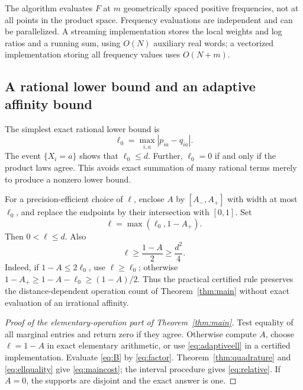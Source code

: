 \documentclass[11pt]{article}
\theoremstyle{definition}
\theoremstyle{remark}
\begin{document}
The algorithm evaluates $F$ at $m$ geometrically spaced positive frequencies, not at all points in the product space. Frequency evaluations are independent and can be parallelized. A streaming implementation stores the local weights and log ratios and a running sum, using $O(N)$ auxiliary real words; a vectorized implementation storing all frequency values uses $O(N+m)$.

\subsection{A rational lower bound and an adaptive affinity bound}

The simplest exact rational lower bound is
\begin{equation}
 \ell_0=\max_{i,a}|p_{ia}-q_{ia}|.
 \label{eq:l0}
\end{equation}
The event $\{X_i=a\}$ shows that $\ell_0\le d$. Further, $\ell_0=0$ if and only if the product laws agree. This avoids exact summation of many rational terms merely to produce a nonzero lower bound.

For a precision-efficient choice of $\ell$, enclose $A$ by $[A_-,A_+]$ with width at most $\ell_0$, and replace the endpoints by their intersection with $[0,1]$. Set
\begin{equation}
 \ell=\max(\ell_0,1-A_+).
 \label{eq:adaptiveell}
\end{equation}
Then $0<\ell\le d$. Also
\begin{equation}
 \ell\ge\frac{1-A}{2}\ge\frac{d^2}{4}.
 \label{eq:ellquality}
\end{equation}
Indeed, if $1-A\le2\ell_0$, use $\ell\ge\ell_0$; otherwise $1-A_+\ge1-A-\ell_0\ge(1-A)/2$. Thus the practical certified rule preserves the distance-dependent operation count of Theorem~\ref{thm:main} without exact evaluation of an irrational affinity.

\begin{proof}[Proof of the elementary-operation part of Theorem~\ref{thm:main}]
Test equality of all marginal entries and return zero if they agree. Otherwise compute $A$, choose $\ell=1-A$ in exact elementary arithmetic, or use \eqref{eq:adaptiveell} in a certified implementation. Evaluate \eqref{eq:B} by \eqref{eq:factor}. Theorem~\ref{thm:quadrature} and \eqref{eq:ellquality} give \eqref{eq:maincost}; the interval procedure gives \eqref{eq:relative}. If $A=0$, the supports are disjoint and the exact answer is one.
\end{proof}
\end{document}
